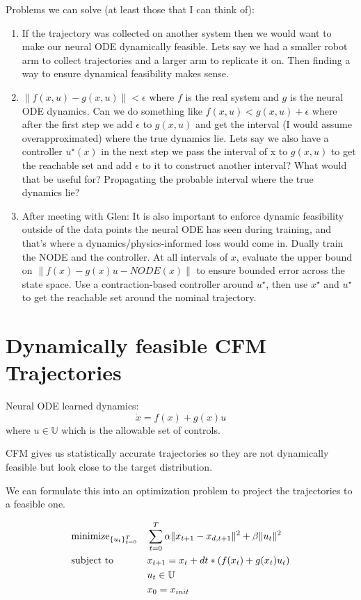 \documentclass[12pt]{article}
\begin{document}
Problems we can solve (at least those that I can think of):
\begin{enumerate}
    \item If the trajectory was collected on another system then we would want to make our neural ODE dynamically feasible. Lets say we had a smaller robot arm to collect trajectories and a larger arm to replicate it on. Then finding a way to ensure dynamical feasibility makes sense. 
    \item \(\|f(x,u) - g(x,u)\| < \epsilon\) where \(f\) is the real system and \(g\) is the neural ODE dynamics. Can we do something like \(f(x,u) < g(x,u) + \epsilon\) where after the first step we add \(\epsilon\) to \(g(x,u)\) and get the interval (I would assume overapproximated) where the true dynamics lie. Lets say we also have a controller \(u^{\star}(x)\) in the next step we pass the interval of x to \(g(x,u)\) to get the reachable set and add \(\epsilon\) to it to construct another interval? What would that be useful for? Propagating the probable interval where the true dynamics lie?
    \item After meeting with Glen: It is also important to enforce dynamic feasibility outside of the data points the neural ODE has seen during training, and that's where a dynamics/physics-informed loss would come in. Dually train the NODE and the controller. At all intervals of \(x\), evaluate the upper bound on \(\|f(x) - g(x)u - NODE(x)\|\) to ensure bounded error across the state space. Use a contraction-based controller around \(u^{\star}\), then use \(x^{\star}\) and \(u^{\star}\) to get the reachable set around the nominal trajectory.
\end{enumerate}

\section{Dynamically feasible CFM Trajectories}
Neural ODE learned dynamics:\[\dot{x} = f(x) + g(x)u\] where \(u \in \mathbb{U}\) which is the allowable set of controls. 

CFM gives us statistically accurate trajectories so they are not dynamically feasible but look close to the target distribution.

We can formulate this into an optimization problem to project the trajectories to a feasible one.

\[
\begin{aligned}
    &\text{minimize}_{\{u_t\}_{t=0}^T} &&  \sum_{t=0}^{T} \alpha \|x_{t+1} - x_{d,t+1}\|^2 + \beta \|u_t\|^2 \notag \\
    &\text{subject to} && x_{t+1} = x_{t} + dt * (f(x_{t}) + g(x_{t})u_{t}) \notag \\
    &&& u_{t} \in \mathbb{U} \notag \\
    &&& x_0 = x_{init} \notag \\
\end{aligned}
\]
\end{document}
